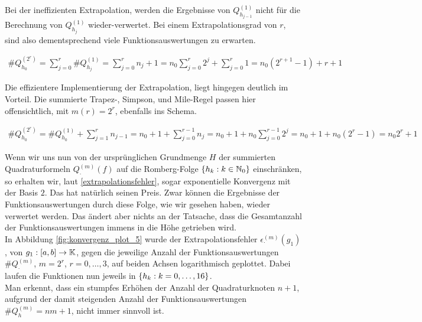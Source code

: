 Bei der ineffizienten Extrapolation, werden die Ergebnisse von $Q_{h_{j-1}}^{(1)}$ nicht für die Berechnung von $Q_{h_j}^{(1)}$ wieder-verwertet. Bei einem Extrapolationsgrad von $r$, sind also dementsprechend viele Funktionsauswertungen zu erwarten.

\begin{align*}
    \# Q_{h_0}^{(2^r)}
    = \sum_{j=0}^r \# Q_{h_j}^{(1)}
    = \sum_{j=0}^r n_j + 1
    = n_0 \sum_{j=0}^r 2^j + \sum_{j=0}^r 1
    = n_0 (2^{r+1} - 1) + r + 1
\end{align*}

Die effizientere Implementierung der Extrapolation, liegt hingegen deutlich im Vorteil. Die summierte Trapez-, Simpson, und Mile-Regel passen hier offensichtlich, mit $m(r) = 2^r$, ebenfalls ins Schema.

\begin{align*}
    \# Q_{h_0}^{(2^r)}
    = \# Q_{h_0}^{(1)} + \sum_{j=1}^r n_{j-1}
    = n_0 + 1 + \sum_{j=0}^{r-1} n_j
    = n_0 + 1 + n_0 \sum_{j=0}^{r-1} 2^j
    = n_0 + 1 + n_0 (2^r - 1)
    = n_0 2^r + 1
\end{align*}

Wenn wir uns nun von der ursprünglichen Grundmenge $H$ der summierten Quadraturformeln $Q_\cdot^{(m)}(f)$ auf die Romberg-Folge $\left \{ h_k: k \in \mathbb{N}_0 \right \}$ einschränken, so erhalten wir, laut \eqref{extrapolationsfehler}, sogar exponentielle Konvergenz mit der Basis $2$. Das hat natürlich seinen Preis. Zwar können die Ergebnisse der Funktionsauswertungen durch diese Folge, wie wir gesehen haben, wieder verwertet werden. Das ändert aber nichts an der Tatsache, dass die Gesamtanzahl der Funktionsauswertungen immens in die Höhe getrieben wird. \\

In Abbildung \ref{fig:konvergenz_plot_5} wurde der Extrapolationsfehler $\epsilon_\cdot^{(m)}(g_1)$, von $g_1: [a, b] \to \mathbb{K}$, gegen die jeweilige Anzahl der Funktionsauswertungen $\# Q_\cdot^{(m)}$, $m = 2^r$, $r = 0, \ldots, 3$, auf beiden Achsen logarithmisch geplottet. Dabei laufen die Funktionen nun jeweils in $\left \{ h_k: k = 0, \ldots, 16 \right \}$. \\



Man erkennt, dass ein stumpfes Erhöhen der Anzahl der Quadraturknoten $n+1$, aufgrund der damit steigenden Anzahl der Funktionsauswertungen $\# Q_h^{(m)} = nm +1$, nicht immer sinnvoll ist. \\

